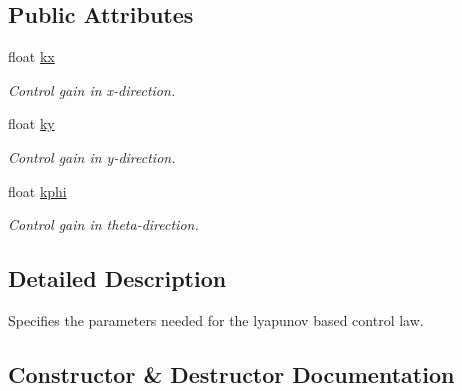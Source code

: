 \subsection*{Public Attributes}
\begin{DoxyCompactItemize}
\item 
float \hyperlink{structController_1_1LyapunovParameter_a4183bf21c97669dc44d4f67cb9a0d26c}{kx}\hypertarget{structController_1_1LyapunovParameter_a4183bf21c97669dc44d4f67cb9a0d26c}{}\label{structController_1_1LyapunovParameter_a4183bf21c97669dc44d4f67cb9a0d26c}

\begin{DoxyCompactList}\small\item\em Control gain in x-\/direction. \end{DoxyCompactList}\item 
float \hyperlink{structController_1_1LyapunovParameter_a4cde698202cddb2fb3971fcc0f0804ca}{ky}\hypertarget{structController_1_1LyapunovParameter_a4cde698202cddb2fb3971fcc0f0804ca}{}\label{structController_1_1LyapunovParameter_a4cde698202cddb2fb3971fcc0f0804ca}

\begin{DoxyCompactList}\small\item\em Control gain in y-\/direction. \end{DoxyCompactList}\item 
float \hyperlink{structController_1_1LyapunovParameter_a4ffd5e85451097367940acc6536d2a4c}{kphi}\hypertarget{structController_1_1LyapunovParameter_a4ffd5e85451097367940acc6536d2a4c}{}\label{structController_1_1LyapunovParameter_a4ffd5e85451097367940acc6536d2a4c}

\begin{DoxyCompactList}\small\item\em Control gain in theta-\/direction. \end{DoxyCompactList}\end{DoxyCompactItemize}


\subsection{Detailed Description}
Specifies the parameters needed for the lyapunov based control law. 

\subsection{Constructor \& Destructor Documentation}
